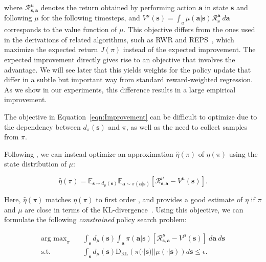 where $\mathcal{R}_{{\mathbf{s}},{\mathbf{a}}}^\mu$ denotes the return obtained by performing action ${\mathbf{a}}$ in state ${\mathbf{s}}$ and following $\mu$ for the following timesteps, and $V^\mu({\mathbf{s}}) = \int_a \mu({\mathbf{a}} | {\mathbf{s}}) \mathcal{R}_{\mathbf{s}}^{\mathbf{a}} \ d{\mathbf{a}}$ corresponds to the value function of $\mu$. 
This objective differs from the ones used in the derivations of related algorithms, such as RWR and REPS~\citep{Peters2007RWR,Peters2010REP,abdolmaleki2018maximum}, which maximize the expected return $J(\pi)$ instead of the expected improvement. The expected improvement directly gives rise to an objective that involves the advantage. We will see later that this yields weights for the policy update that differ in a subtle but important way from standard reward-weighted regression. As we show in our experiments, this difference results in a large empirical improvement.

The objective in Equation~\ref{eqn:Improvement} can be difficult to optimize due to the dependency between $d_\pi({\mathbf{s}})$ and $\pi$, as well as the need to collect samples from $\pi$.

Following \citet{TRPOschulman15}, we can instead optimize an approximation $\hat{\eta}(\pi)$ of $\eta(\pi)$ using the state distribution of $\mu$:

\begin{equation}
    \hat{\eta}(\pi) = \mathbb{E}_{{\mathbf{s}} \sim d_\mu({\mathbf{s}})} \mathbb{E}_{{\mathbf{a}} \sim \pi({\mathbf{a}} | {\mathbf{s}})} \left[\mathcal{R}_{{\mathbf{s}},{\mathbf{a}}}^\mu - V^\mu({\mathbf{s}})\right]. \label{eqn:ApproxImprovement}
\end{equation}

Here, $\hat{\eta}(\pi)$ matches $\eta(\pi)$ to first order \citep{Kakade2002}, and provides a good estimate of $\eta$ if $\pi$ and $\mu$ are close in terms of the KL-divergence~\citep{TRPOschulman15}. Using this objective, we can formulate the following \emph{constrained} policy search problem:

\begin{align}
    \mathop{\mathrm{arg \ max}}_{\pi} \quad & \int_{\mathbf{s}} d_\mu({\mathbf{s}}) \int_{\mathbf{a}} \pi({\mathbf{a}} | {\mathbf{s}}) \left[\mathcal{R}_{{\mathbf{s}},{\mathbf{a}}}^\mu - V^\mu({\mathbf{s}})\right] \ d{\mathbf{a}} \ d{\mathbf{s}} \\
    \textrm{s.t.} \quad & \int_{\mathbf{s}} d_\mu({\mathbf{s}}) \mathrm{D_{KL}} \left( \pi(\cdot |{\mathbf{s}}) || \mu(\cdot |{\mathbf{s}}) \right) d{\mathbf{s}} \leq \epsilon . \label{eqn:AWRCons0}

\end{align}

